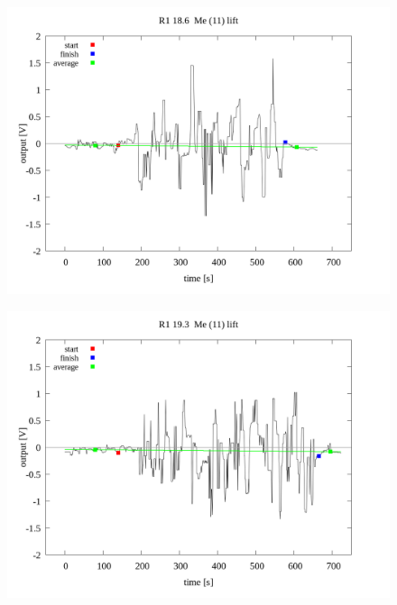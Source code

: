 \documentclass[a4paper]{jsarticle}
\begin{document}
\begin{figure}[htbp]
    \footnotesize
    \begin{center}
        \includegraphics[width=140mm]{../../../../33_result/210806/median/11/lift/03/R1_18.6_me(11)_lift_03.png}
    \end{center}
\end{figure}

\begin{figure}[htbp]
    \footnotesize
    \begin{center}
        \includegraphics[width=140mm]{../../../../33_result/210806/median/11/lift/03/R1_19.3_me(11)_lift_03.png}
    \end{center}
\end{figure}
\end{document}
